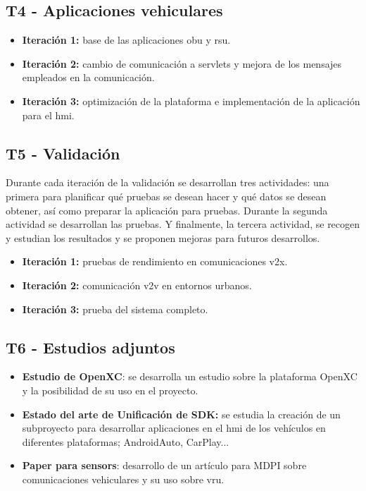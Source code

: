 \subsection{T4 - Aplicaciones vehiculares}
\begin{itemize}
	\item \textbf{Iteración 1:} base de las aplicaciones \gls{obu} y \gls{rsu}.

	\item \textbf{Iteración 2:} cambio de comunicación a servlets y mejora de los mensajes empleados en la
	comunicación.

	\item \textbf{Iteración 3:} optimización de la plataforma e implementación de la aplicación para el \gls{hmi}.
\end{itemize}

\subsection{T5 - Validación}
Durante cada iteración de la validación se desarrollan tres actividades: una primera para planificar qué
pruebas se desean hacer y qué datos se desean obtener, así como preparar la aplicación para pruebas. Durante
la segunda actividad se desarrollan las pruebas. Y finalmente, la tercera actividad, se recogen y estudian los
resultados y se proponen mejoras para futuros desarrollos.
\begin{itemize}
	\item \textbf{Iteración 1:} pruebas de rendimiento en comunicaciones \gls{v2x}.

	\item \textbf{Iteración 2:} comunicación \gls{v2v} en entornos urbanos.

	\item \textbf{Iteración 3:} prueba del sistema completo.
\end{itemize}

\subsection{T6 - Estudios adjuntos}
\begin{itemize}
	\item \textbf{Estudio de OpenXC}: se desarrolla un estudio sobre la plataforma OpenXC y la posibilidad de
	su uso en el proyecto.

	\item \textbf{Estado del arte de Unificación de SDK:} se estudia la creación de un subproyecto para
	desarrollar aplicaciones en el \gls{hmi} de los vehículos en diferentes plataformas; AndroidAuto, CarPlay...

	\item \textbf{Paper para sensors}: desarrollo de un artículo para MDPI sobre comunicaciones vehiculares y
	su uso sobre \gls{vru}.
\end{itemize}


